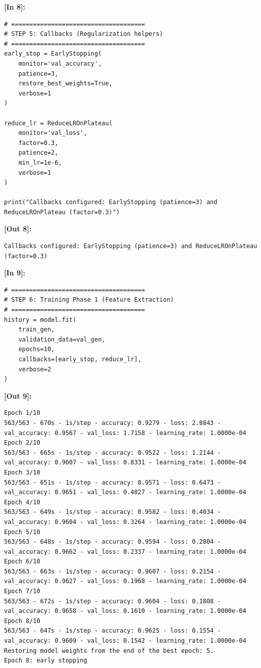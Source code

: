 \vspace{0.6em}
\noindent\textbf{\small [In 8]:}
\begin{lstlisting}[style=pycode]
# =====================================
# STEP 5: Callbacks (Regularization helpers)
# =====================================
early_stop = EarlyStopping(
    monitor='val_accuracy',
    patience=3,
    restore_best_weights=True,
    verbose=1
)

reduce_lr = ReduceLROnPlateau(
    monitor='val_loss',
    factor=0.3,
    patience=2,
    min_lr=1e-6,
    verbose=1
)

print("Callbacks configured: EarlyStopping (patience=3) and ReduceLROnPlateau (factor=0.3)")\end{lstlisting}
\noindent\textbf{\small [Out 8]:}
\begin{lstlisting}[style=output]
Callbacks configured: EarlyStopping (patience=3) and ReduceLROnPlateau (factor=0.3)
\end{lstlisting}

\vspace{0.6em}
\noindent\textbf{\small [In 9]:}
\begin{lstlisting}[style=pycode]
# =====================================
# STEP 6: Training Phase 1 (Feature Extraction)
# =====================================
history = model.fit(
    train_gen,
    validation_data=val_gen,
    epochs=10,
    callbacks=[early_stop, reduce_lr],
    verbose=2
)\end{lstlisting}
\noindent\textbf{\small [Out 9]:}
\begin{lstlisting}[style=output]
Epoch 1/10
563/563 - 670s - 1s/step - accuracy: 0.9279 - loss: 2.8843 - val_accuracy: 0.9567 - val_loss: 1.7158 - learning_rate: 1.0000e-04
Epoch 2/10
563/563 - 665s - 1s/step - accuracy: 0.9522 - loss: 1.2144 - val_accuracy: 0.9607 - val_loss: 0.8331 - learning_rate: 1.0000e-04
Epoch 3/10
563/563 - 651s - 1s/step - accuracy: 0.9571 - loss: 0.6473 - val_accuracy: 0.9651 - val_loss: 0.4827 - learning_rate: 1.0000e-04
Epoch 4/10
563/563 - 649s - 1s/step - accuracy: 0.9582 - loss: 0.4034 - val_accuracy: 0.9604 - val_loss: 0.3264 - learning_rate: 1.0000e-04
Epoch 5/10
563/563 - 648s - 1s/step - accuracy: 0.9594 - loss: 0.2804 - val_accuracy: 0.9662 - val_loss: 0.2337 - learning_rate: 1.0000e-04
Epoch 6/10
563/563 - 663s - 1s/step - accuracy: 0.9607 - loss: 0.2154 - val_accuracy: 0.9627 - val_loss: 0.1968 - learning_rate: 1.0000e-04
Epoch 7/10
563/563 - 672s - 1s/step - accuracy: 0.9604 - loss: 0.1808 - val_accuracy: 0.9658 - val_loss: 0.1610 - learning_rate: 1.0000e-04
Epoch 8/10
563/563 - 647s - 1s/step - accuracy: 0.9625 - loss: 0.1554 - val_accuracy: 0.9609 - val_loss: 0.1542 - learning_rate: 1.0000e-04
Restoring model weights from the end of the best epoch: 5.
Epoch 8: early stopping
\end{lstlisting}


